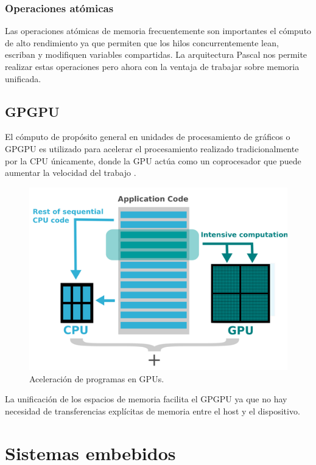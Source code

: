 \subsubsection{Operaciones atómicas} 
Las operaciones atómicas de memoria frecuentemente son importantes el cómputo de alto rendimiento ya que permiten que los hilos concurrentemente lean, escriban y modifiquen variables compartidas. La arquitectura Pascal nos permite realizar estas operaciones pero ahora con la ventaja de trabajar sobre memoria unificada.

\subsection{GPGPU}
El cómputo de propósito general en unidades de procesamiento de gráficos o GPGPU es utilizado para acelerar el procesamiento realizado tradicionalmente por la CPU únicamente, donde la GPU actúa como un coprocesador que puede aumentar la velocidad del trabajo \cite{GpuCpu}.

\begin{figure}[ht]
  \centering
    \includegraphics[scale=0.9]{img/gpgpu}
    \caption{Aceleración de programas en GPUs\cite{gpgpu}.}
    \label{fig:gpgpu}
\end{figure}

La unificación de los espacios de memoria facilita el GPGPU ya que no hay necesidad de transferencias explícitas de memoria entre el host y el dispositivo.


\section{Sistemas embebidos}

